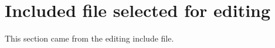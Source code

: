 \section*{Included file selected for editing}\noindent This section came from the editing include file.
